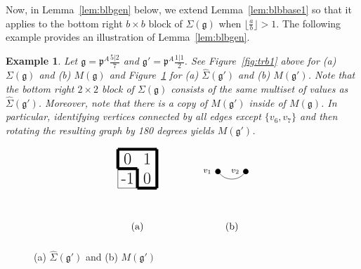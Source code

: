 \documentclass[letterpaper,10pt]{article}
\newtheorem{Ex}[theorem]{Example}
\begin{document}
Now, in Lemma~\ref{lem:blbgen} below, we extend Lemma~\ref{lem:blbbase1} so that it applies to the bottom right $b\times b$ block of $\Sigma(\mathfrak{g})$ when $\lfloor\frac{a}{b}\rfloor>1$. The following example provides an illustration of Lemma~\ref{lem:blbgen}.

\begin{Ex}
Let $\mathfrak{g}=\mathfrak{p}^A\frac{5|2}{7}$ and $\mathfrak{g}'=\mathfrak{p}^A\frac{1|1}{2}$. See Figure~\ref{fig:trb1} above for \textup{(a)} $\Sigma(\mathfrak{g})$ and \textup{(b)} $M(\mathfrak{g})$ and Figure~\ref{fig:brbtiny} for \textup{(a)} $\widehat{\Sigma}(\mathfrak{g}')$ and \textup{(b)} $M(\mathfrak{g}')$. Note that the bottom right $2\times 2$ block of $\Sigma(\mathfrak{g})$ consists of the same multiset of values as $\widehat{\Sigma}(\mathfrak{g}')$. Moreover, note that there is a copy of $M(\mathfrak{g}')$ inside of $M(\mathfrak{g})$. In particular, identifying vertices connected by all edges except $\{v_6,v_7\}$ and then rotating the resulting graph by 180 degrees yields $M(\mathfrak{g}')$.
\end{Ex}
\begin{figure}[H]
$$\begin{tikzpicture}[scale=0.7]
\draw (2,2) -- (2,4);
\draw (2,4) -- (4,4);
\draw (4,4) -- (4,2);
\draw (4,2) -- (2,2);
\draw [line width=3](2,4) -- (4,4);
\draw [line width=3](4,4) -- (4,2);
\draw [line width=3](4,2) -- (3,2);
\draw [line width=3](3,2) -- (3,3);
\draw [line width=3](3,3) -- (2,3);
\draw [line width=3](2,3) -- (2,4);
\node at (2.5,3.5) {\LARGE{0}};
\node at (3.5,3.5) {\LARGE{1}};
\node at (2.5,2.5) {\LARGE{-1}};
\node at (3.5,2.5) {\LARGE{0}};
\node at (3, 0) {(a)};

\end{tikzpicture}\hspace{1.5cm}\begin{tikzpicture}
	\def\Node{\node [circle,  fill, inner sep=2pt]}
	\tikzset{->-/.style={decoration={
  markings,
  mark=at position .55 with {\arrow{>}}},postaction={decorate}}}
	\node at (0,-0.3) {};
    \Node[label=left:\footnotesize {$v_1$}] (1) at (0,1.5) {};
	\Node[label=left:\footnotesize {$v_2$}] (2) at (1,1.5) {};
	\draw (1) to[bend right=50] (2);
    \node at (0.5, -0.5) {(b)};
\end{tikzpicture}$$
    \caption{(a) $\widehat{\Sigma}(\mathfrak{g}')$ and (b) $M(\mathfrak{g}')$}
    \label{fig:brbtiny}
\end{figure}
\end{document}
